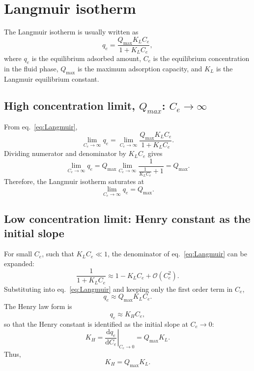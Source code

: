 	\section{Langmuir isotherm}
	
	The Langmuir isotherm is usually written as
	\begin{equation}
		q_e = \frac{Q_{\max} K_L C_e}{1 + K_L C_e},
		\label{eq:Langmuir}
	\end{equation}
	where \(q_e\) is the equilibrium adsorbed amount, \(C_e\) is the equilibrium
	concentration in the fluid phase, \(Q_{\max}\) is the maximum adsorption
	capacity, and \(K_L\) is the Langmuir equilibrium constant.
	
	\subsection{High concentration limit, $Q_{max}$: \(C_e \to \infty\)}
	
	 
	From eq.~\eqref{eq:Langmuir},
	\begin{equation}
		\lim_{C_e \to \infty} q_e
		= \lim_{C_e \to \infty}
		\frac{Q_{\max} K_L C_e}{1 + K_L C_e}.
	\end{equation}
	Dividing numerator and denominator by \(K_L C_e\) gives
	\begin{equation}
		\lim_{C_e \to \infty} q_e
		= Q_{\max} \lim_{C_e \to \infty}
		\frac{1}{\frac{1}{K_L C_e} + 1}
		= Q_{\max}.
	\end{equation}
	Therefore, the Langmuir isotherm saturates at
	\begin{equation}
		\boxed{\displaystyle \lim_{C_e \to \infty} q_e = Q_{\max}}.
	\end{equation}
	
	\subsection{Low concentration limit: Henry constant as the initial slope}
	
	For small \(C_e\), such that \(K_L C_e \ll 1\), the denominator of
	eq.~\eqref{eq:Langmuir} can be expanded:
	\begin{equation}
		\frac{1}{1 + K_L C_e} \approx 1 - K_L C_e + \mathcal{O}(C_e^2).
	\end{equation}
	Substituting into eq.~\eqref{eq:Langmuir} and keeping only the first order
	term in \(C_e\),
	\begin{equation}
		q_e \approx Q_{\max} K_L C_e.
	\end{equation}
	The Henry law form is
	\begin{equation}
		q_e \approx K_H C_e,
	\end{equation}
	so that the Henry constant is identified as the initial slope at
	\(C_e \to 0\):
	\begin{equation}
		K_H = \left.\frac{\mathrm{d}q_e}{\mathrm{d}C_e}\right|_{C_e \to 0}
		= Q_{\max} K_L.
	\end{equation}
	Thus,
	\begin{equation}
		\boxed{K_H = Q_{\max} K_L.}
	\end{equation}
	
